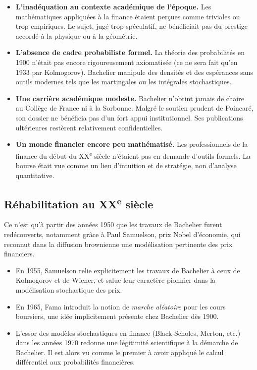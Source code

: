 \documentclass[12pt,a4paper]{article}
\begin{document}
\begin{itemize}
    \item \textbf{L’inadéquation au contexte académique de l’époque.} Les mathématiques appliquées à la finance étaient perçues comme triviales ou trop empiriques. Le sujet, jugé trop spéculatif, ne bénéficiait pas du prestige accordé à la physique ou à la géométrie.
    
    \item \textbf{L’absence de cadre probabiliste formel.} La théorie des probabilités en 1900 n’était pas encore rigoureusement axiomatisée (ce ne sera fait qu’en 1933 par Kolmogorov). Bachelier manipule des densités et des espérances sans outils modernes tels que les martingales ou les intégrales stochastiques.

    \item \textbf{Une carrière académique modeste.} Bachelier n’obtint jamais de chaire au Collège de France ni à la Sorbonne. Malgré le soutien prudent de Poincaré, son dossier ne bénéficia pas d’un fort appui institutionnel. Ses publications ultérieures restèrent relativement confidentielles.

    \item \textbf{Un monde financier encore peu mathématisé.} Les professionnels de la finance du début du XX\textsuperscript{e} siècle n’étaient pas en demande d’outils formels. La bourse était vue comme un lieu d’intuition et de stratégie, non d’analyse quantitative.
\end{itemize}

\subsection{Réhabilitation au XX\textsuperscript{e} siècle}

Ce n’est qu’à partir des années 1950 que les travaux de Bachelier furent redécouverts, notamment grâce à Paul Samuelson, prix Nobel d’économie, qui reconnut dans la diffusion brownienne une modélisation pertinente des prix financiers.

\begin{itemize}
    \item En 1955, Samuelson relie explicitement les travaux de Bachelier à ceux de Kolmogorov et de Wiener, et salue leur caractère pionnier dans la modélisation stochastique des prix.
    
    \item En 1965, Fama introduit la notion de \textit{marche aléatoire} pour les cours boursiers, une idée implicitement présente chez Bachelier dès 1900.

    \item L’essor des modèles stochastiques en finance (Black-Scholes, Merton, etc.) dans les années 1970 redonne une légitimité scientifique à la démarche de Bachelier. Il est alors vu comme le premier à avoir appliqué le calcul différentiel aux probabilités financières.
\end{itemize}
\end{document}

